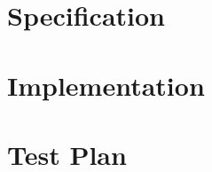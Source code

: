 \documentclass[paper=a4, fontsize=11pt]{report} %
\begin{document}


\chapter{Specification} %
\label{cha:specification}







\chapter{Implementation} %
\label{cha:implementation}





\chapter{Test Plan} %
\label{cha:test_plan}



\end{document}
